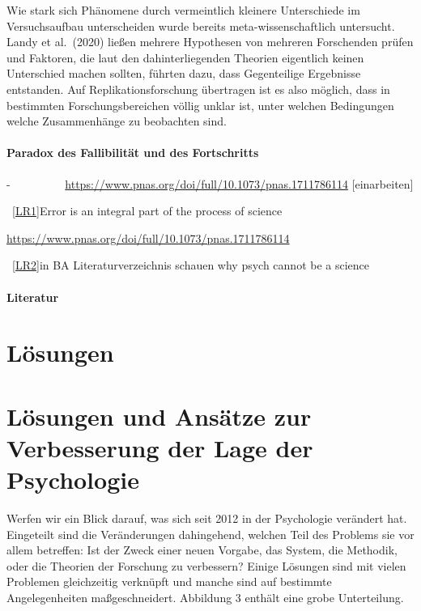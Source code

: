 \documentclass[
  letterpaper,
  DIV=11,
  numbers=noendperiod]{scrreprt}
\begin{document}
Wie stark sich Phänomene durch vermeintlich kleinere Unterschiede im
Versuchsaufbau unterscheiden wurde bereits meta-wissenschaftlich
untersucht. Landy et al.~(2020) ließen mehrere Hypothesen von mehreren
Forschenden prüfen und Faktoren, die laut den dahinterliegenden Theorien
eigentlich keinen Unterschied machen sollten, führten dazu, dass
Gegenteilige Ergebnisse entstanden. Auf Replikationsforschung übertragen
ist es also möglich, dass in bestimmten Forschungsbereichen völlig
unklar ist, unter welchen Bedingungen welche Zusammenhänge zu beobachten
sind.

\subsection{Paradox des Fallibilität und des
Fortschritts}\label{paradox-des-fallibilituxe4t-und-des-fortschritts}

-~~~~~~~~~ \url{https://www.pnas.org/doi/full/10.1073/pnas.1711786114}
{[}einarbeiten{]}

~\hyperref[_msoanchor_1]{{[}LR1{]}}Error is an integral part of the
process of science

\url{https://www.pnas.org/doi/full/10.1073/pnas.1711786114}

~\hyperref[_msoanchor_2]{{[}LR2{]}}in BA Literaturverzeichnis schauen
why psych cannot be a science

\subsection{Literatur}\label{literatur-10}

\part{Lösungen}

\part{Lösungen und Ansätze zur Verbesserung der Lage der Psychologie}

Werfen wir ein Blick darauf, was sich seit 2012 in der Psychologie
verändert hat. Eingeteilt sind die Veränderungen dahingehend, welchen
Teil des Problems sie vor allem betreffen: Ist der Zweck einer neuen
Vorgabe, das System, die Methodik, oder die Theorien der Forschung zu
verbessern? Einige Lösungen sind mit vielen Problemen gleichzeitig
verknüpft und manche sind auf bestimmte Angelegenheiten maßgeschneidert.
Abbildung 3 enthält eine grobe Unterteilung.
\end{document}
